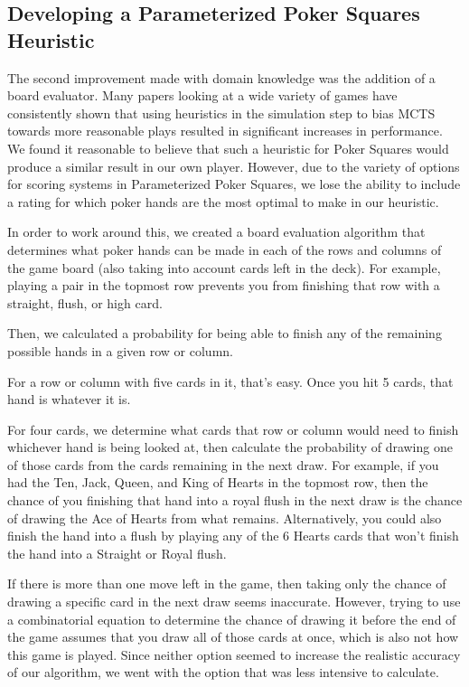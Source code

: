 \documentclass[letterpaper]{article}
\begin{document}
\subsection {Developing a Parameterized Poker Squares Heuristic}
The second improvement made with domain knowledge was the addition of a board evaluator. Many papers looking at a wide variety of games have consistently shown that using heuristics in the simulation step to bias MCTS towards more reasonable plays resulted in significant increases in performance. We found it reasonable to believe that such a heuristic for Poker Squares would produce a similar result in our own player. However, due to the variety of options for scoring systems in Parameterized Poker Squares, we lose the ability to include a rating for which poker hands are the most optimal to make in our heuristic.

In order to work around this, we created a board evaluation algorithm that determines what poker hands can be made in each of the rows and columns of the game board (also taking into account cards left in the deck). For example, playing a pair in the topmost row prevents you from finishing that row with a straight, flush, or high card.

Then, we calculated a probability for being able to finish any of the remaining possible hands in a given row or column. 

For a row or column with five cards in it, that’s easy. Once you hit 5 cards, that hand is whatever it is.

For four cards, we determine what cards that row or column would need to finish whichever hand is being looked at, then calculate the probability of drawing one of those cards from the cards remaining in the next draw. For example, if you had the Ten, Jack, Queen, and King of Hearts in the topmost row, then the chance of you finishing that hand into a royal flush in the next draw is the chance of drawing the Ace of Hearts from what remains. Alternatively, you could also finish the hand into a flush by playing any of the 6 Hearts cards that won’t finish the hand into a Straight or Royal flush.

If there is more than one move left in the game, then taking only the chance of drawing a specific card in the next draw seems inaccurate. However, trying to use a combinatorial equation to determine the chance of drawing it before the end of the game assumes that you draw all of those cards at once, which is also not how this game is played. Since neither option seemed to increase the realistic accuracy of our algorithm, we went with the option that was less intensive to calculate.
\end{document}
